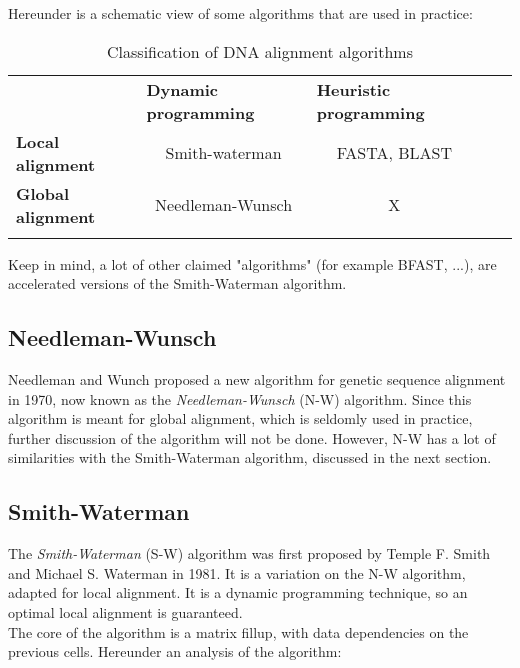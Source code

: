 Hereunder is a schematic view of some algorithms that are used in practice:

\begin{table}[H]
	\begin{tabular}{lllll}
		\cline{1-3}
		\multicolumn{1}{|l|}{}                          & \multicolumn{1}{l|}{\textbf{Dynamic programming}} & \multicolumn{1}{l|}{\textbf{Heuristic programming}} &  &  \\ \cline{1-3}
		\multicolumn{1}{|l|}{\textbf{Local alignment}}  & \multicolumn{1}{c|}{Smith-waterman}               & \multicolumn{1}{c|}{FASTA, BLAST}                   &  &  \\ \cline{1-3}
		\multicolumn{1}{|l|}{\textbf{Global alignment}} & \multicolumn{1}{c|}{Needleman-Wunsch}             & \multicolumn{1}{c|}{X}                              &  &  \\ \cline{1-3}
		&                                                   &                                                     &  & 
	\end{tabular}
	\caption{Classification of DNA alignment algorithms}
\end{table}


Keep in mind, a lot of other claimed "algorithms" (for example BFAST, ...), are accelerated versions of the Smith-Waterman algorithm.

\subsection{Needleman-Wunsch}
Needleman and Wunch proposed a new algorithm for genetic sequence alignment in 1970, now known as the \emph{Needleman-Wunsch} (N-W) algorithm. Since this algorithm is meant for global alignment, which is seldomly used in practice, further discussion of the algorithm will not be done. However, N-W has a lot of similarities with the Smith-Waterman algorithm, discussed in the next section.

\subsection{Smith-Waterman}
\label{expl:SWanalyse}
The \emph{Smith-Waterman} (S-W) algorithm was first proposed by Temple F. Smith and Michael S. Waterman in 1981\cite{SW}. It is a variation on the N-W algorithm, adapted for local alignment. It is a dynamic programming technique, so an optimal local alignment is guaranteed. \\

The core of the algorithm is a matrix fillup, with data dependencies on the previous cells. Hereunder an analysis of the algorithm:

